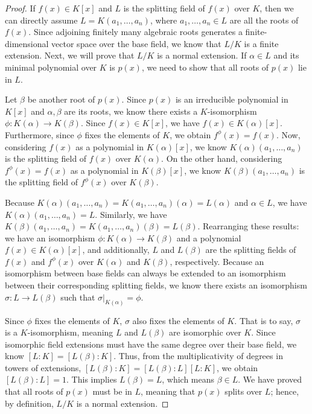 \documentclass{article}
\begin{document}
\begin{proof}
If $f(x) \in K[x]$ and $L$ is the splitting field of $f(x)$ over $K$, then we can directly assume $L = K(a_1, \dots, a_n)$, where $a_1, \dots, a_n \in L$ are all the roots of $f(x)$. Since adjoining finitely many algebraic roots generates a finite-dimensional vector space over the base field, we know that $L/K$ is a finite extension. Next, we will prove that $L/K$ is a normal extension. If $\alpha \in L$ and its minimal polynomial over $K$ is $p(x)$, we need to show that all roots of $p(x)$ lie in $L$.

Let $\beta$ be another root of $p(x)$. Since $p(x)$ is an irreducible polynomial in $K[x]$ and $\alpha, \beta$ are its roots, we know there exists a $K$-isomorphism $\phi: K(\alpha) \to K(\beta)$. Since $f(x) \in K[x]$, we have $f(x) \in K(\alpha)[x]$. Furthermore, since $\phi$ fixes the elements of $K$, we obtain $f^\phi(x) = f(x)$. Now, considering $f(x)$ as a polynomial in $K(\alpha)[x]$, we know $K(\alpha)(a_1, \dots, a_n)$ is the splitting field of $f(x)$ over $K(\alpha)$. On the other hand, considering $f^\phi(x) = f(x)$ as a polynomial in $K(\beta)[x]$, we know $K(\beta)(a_1, \dots, a_n)$ is the splitting field of $f^\phi(x)$ over $K(\beta)$.

Because $K(\alpha)(a_1, \dots, a_n) = K(a_1, \dots, a_n)(\alpha) = L(\alpha)$ and $\alpha \in L$, we have $K(\alpha)(a_1, \dots, a_n) = L$. Similarly, we have $K(\beta)(a_1, \dots, a_n) = K(a_1, \dots, a_n)(\beta) = L(\beta)$. Rearranging these results: we have an isomorphism $\phi: K(\alpha) \to K(\beta)$ and a polynomial $f(x) \in K(\alpha)[x]$, and additionally, $L$ and $L(\beta)$ are the splitting fields of $f(x)$ and $f^\phi(x)$ over $K(\alpha)$ and $K(\beta)$, respectively. Because an isomorphism between base fields can always be extended to an isomorphism between their corresponding splitting fields, we know there exists an isomorphism $\sigma: L \to L(\beta)$ such that $\sigma|_{K(\alpha)} = \phi$.

Since $\phi$ fixes the elements of $K$, $\sigma$ also fixes the elements of $K$. That is to say, $\sigma$ is a $K$-isomorphism, meaning $L$ and $L(\beta)$ are isomorphic over $K$. Since isomorphic field extensions must have the same degree over their base field, we know $[L:K] = [L(\beta):K]$. Thus, from the multiplicativity of degrees in towers of extensions, $[L(\beta):K] = [L(\beta):L][L:K]$, we obtain $[L(\beta):L] = 1$. This implies $L(\beta) = L$, which means $\beta \in L$. We have proved that all roots of $p(x)$ must be in $L$, meaning that $p(x)$ splits over $L$; hence, by definition, $L/K$ is a normal extension.
\end{proof}
\end{document}
